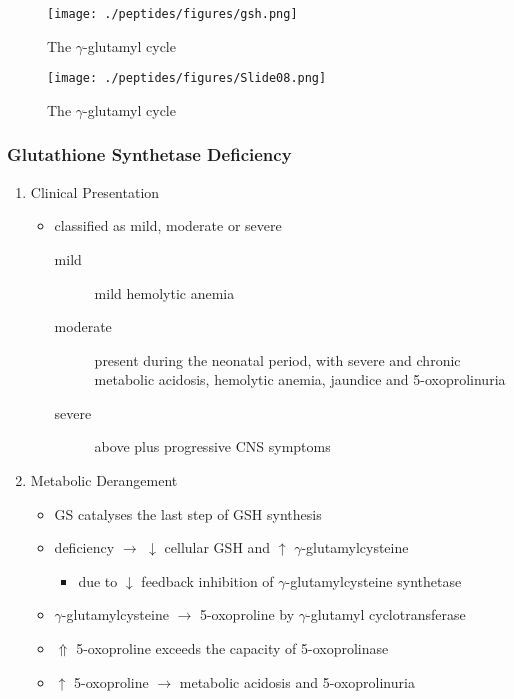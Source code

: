 \documentclass{scrartcl}
\begin{document}
\begin{figure}[htbp]
\centering
\texttt{[image: ./peptides/figures/gsh.png]}
\caption{\label{fig:orge870656}
The \(\gamma\)-glutamyl cycle}
\end{figure}


\begin{figure}[htbp]
\centering
\texttt{[image: ./peptides/figures/Slide08.png]}
\caption{\label{fig:org96df1c0}
The \(\gamma\)-glutamyl cycle}
\end{figure}


\subsubsection{Glutathione Synthetase Deficiency}
\label{sec:org6cb92f6}
\begin{enumerate}
\item Clinical Presentation
\label{sec:org61bd8f0}
\begin{itemize}
\item classified as mild, moderate or severe
\begin{description}
\item[{mild}] mild hemolytic anemia
\item[{moderate}] present during the neonatal period, with severe and
chronic metabolic acidosis, hemolytic anemia, jaundice
and 5-oxoprolinuria
\item[{severe}] above plus progressive CNS symptoms
\end{description}
\end{itemize}

\item Metabolic Derangement
\label{sec:org6560e65}
\begin{itemize}
\item GS catalyses the last step of GSH synthesis
\item deficiency \(\to\) \(\downarrow\) cellular GSH and \(\uparrow\) \(\gamma\)-glutamylcysteine
\begin{itemize}
\item due to \(\downarrow\) feedback inhibition of \(\gamma\)-glutamylcysteine synthetase
\end{itemize}
\item \(\gamma\)-glutamylcysteine \(\to\) 5-oxoproline by \(\gamma\)-glutamyl
cyclotransferase
\item \(\Uparrow\) 5-oxoproline exceeds the capacity of 5-oxoprolinase
\item \(\uparrow\) 5-oxoproline \(\to\) metabolic acidosis and 5-oxoprolinuria
\end{itemize}


\end{enumerate}
\end{document}
